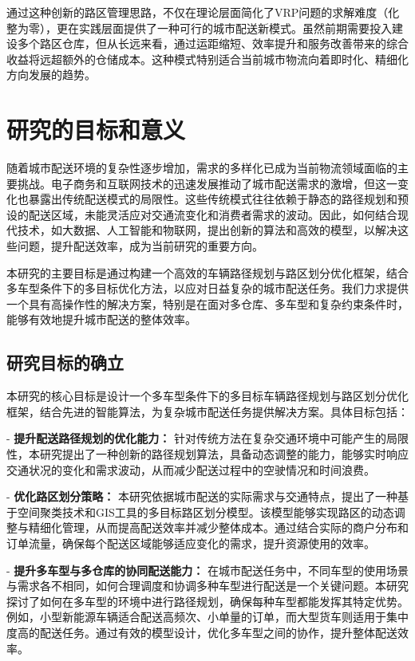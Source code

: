 \documentclass[12pt,a4paper,twoside]{ctexbook}
\begin{document}
通过这种创新的路区管理思路，不仅在理论层面简化了VRP问题的求解难度（化整为零），更在实践层面提供了一种可行的城市配送新模式。虽然前期需要投入建设多个路区仓库，但从长远来看，通过运距缩短、效率提升和服务改善带来的综合收益将远超额外的仓储成本。这种模式特别适合当前城市物流向着即时化、精细化方向发展的趋势。

\section{研究的目标和意义}
随着城市配送环境的复杂性逐步增加，需求的多样化已成为当前物流领域面临的主要挑战。电子商务和互联网技术的迅速发展推动了城市配送需求的激增，但这一变化也暴露出传统配送模式的局限性。这些传统模式往往依赖于静态的路径规划和预设的配送区域，未能灵活应对交通流变化和消费者需求的波动。因此，如何结合现代技术，如大数据、人工智能和物联网，提出创新的算法和高效的模型，以解决这些问题，提升配送效率，成为当前研究的重要方向。

本研究的主要目标是通过构建一个高效的车辆路径规划与路区划分优化框架，结合多车型条件下的多目标优化方法，以应对日益复杂的城市配送任务。我们力求提供一个具有高操作性的解决方案，特别是在面对多仓库、多车型和复杂约束条件时，能够有效地提升城市配送的整体效率。

\subsection{研究目标的确立}

本研究的核心目标是设计一个多车型条件下的多目标车辆路径规划与路区划分优化框架，结合先进的智能算法，为复杂城市配送任务提供解决方案。具体目标包括：

- \textbf{提升配送路径规划的优化能力：} 针对传统方法在复杂交通环境中可能产生的局限性，本研究提出了一种创新的路径规划算法，具备动态调整的能力，能够实时响应交通状况的变化和需求波动，从而减少配送过程中的空驶情况和时间浪费。

- \textbf{优化路区划分策略：} 本研究依据城市配送的实际需求与交通特点，提出了一种基于空间聚类技术和GIS工具的多目标路区划分模型。该模型能够实现路区的动态调整与精细化管理，从而提高配送效率并减少整体成本。通过结合实际的商户分布和订单流量，确保每个配送区域能够适应变化的需求，提升资源使用的效率。

- \textbf{提升多车型与多仓库的协同配送能力：} 在城市配送任务中，不同车型的使用场景与需求各不相同，如何合理调度和协调多种车型进行配送是一个关键问题。本研究探讨了如何在多车型的环境中进行路径规划，确保每种车型都能发挥其特定优势。例如，小型新能源车辆适合配送高频次、小单量的订单，而大型货车则适用于集中度高的配送任务。通过有效的模型设计，优化多车型之间的协作，提升整体配送效率。
\end{document}
